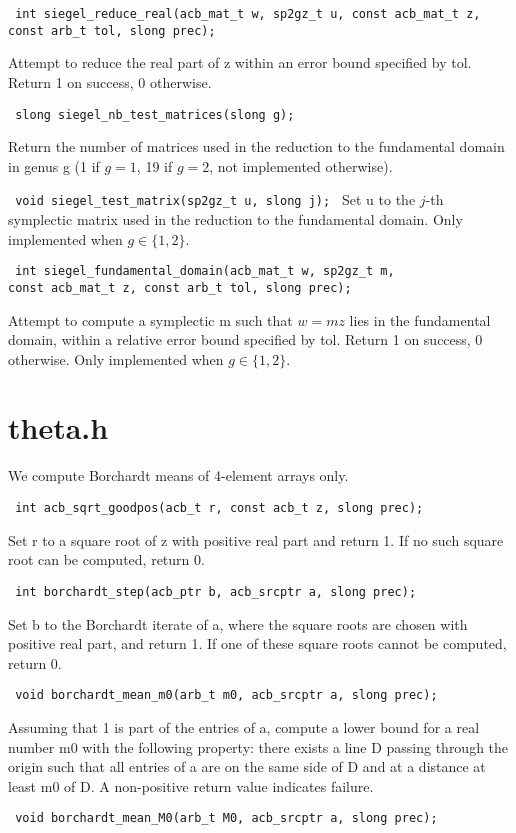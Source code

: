 \documentclass{article}
\newcommand{\code}[1]{\lstinline:#1:}
\newcommand{\fun}[1]{\vspace{2mm}\noindent \code{#1}}
\begin{document}
\fun{
int siegel_reduce_real(acb_mat_t w, sp2gz_t u, const acb_mat_t z,
		       const arb_t tol, slong prec);
}

Attempt to reduce the real part of z within an error bound specified
by tol. Return 1 on success, 0 otherwise.

\fun{
slong siegel_nb_test_matrices(slong g);
}

Return the number of matrices used in the reduction to the fundamental
domain in genus g (1 if $g=1$, 19 if $g=2$, not implemented
otherwise).

\fun{ void siegel_test_matrix(sp2gz_t u, slong j); } Set u to the
$j$-th symplectic matrix used in the reduction to the fundamental
domain. Only implemented when $g\in\{1,2\}$.

\fun{
int siegel_fundamental_domain(acb_mat_t w, sp2gz_t m,
			      const acb_mat_t z, const arb_t tol, slong prec);
}

Attempt to compute a symplectic m such that $w = mz$ lies in the
fundamental domain, within a relative error bound specified by
tol. Return 1 on success, 0 otherwise. Only implemented when $g\in\{1,2\}$.

\section{theta.h}

We compute Borchardt means of 4-element arrays only.

\fun{
int acb_sqrt_goodpos(acb_t r, const acb_t z, slong prec);
}

Set r to a square root of z with positive real part and return 1. If
no such square root can be computed, return 0.

\fun{
int borchardt_step(acb_ptr b, acb_srcptr a, slong prec);
}

Set b to the Borchardt iterate of a, where the square roots are chosen
with positive real part, and return 1. If one of these square roots
cannot be computed, return 0.

\fun{
void borchardt_mean_m0(arb_t m0, acb_srcptr a, slong prec);
}

Assuming that 1 is part of the entries of a, compute a lower bound for
a real number m0 with the following property: there exists a line D
passing through the origin such that all entries of a are on the same
side of D and at a distance at least m0 of D. A non-positive return
value indicates failure.

\fun{
void borchardt_mean_M0(arb_t M0, acb_srcptr a, slong prec);
}
\end{document}
